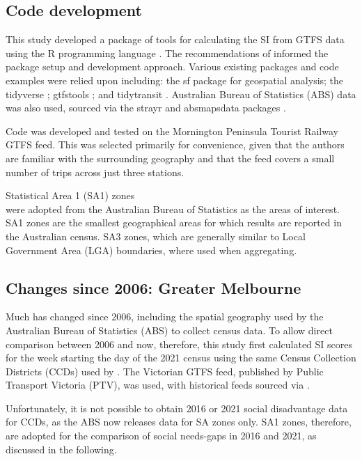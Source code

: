 \documentclass[preprint, 3p,
authoryear]{elsarticle} %
\begin{document}
\subsection{Code development}\label{code-development}

This study developed a package of tools for calculating the SI from GTFS
data using the R programming language \citep{R-base}. The
recommendations of \citet{wickham2023r} informed the package setup and
development approach. Various existing packages and code examples were
relied upon including: the sf package \citep{R-sf} for geospatial
analysis; the tidyverse \citep{tidyverse2019}; gtfstools
\citep{R-gtfstools}; and tidytransit \citep{R-tidytransit}. Australian
Bureau of Statistics (ABS) data was also used, sourced via the strayr
and absmapsdata packages \citep{r-strayr}.

Code was developed and tested on the Mornington Peninsula Tourist
Railway GTFS feed. This was selected primarily for convenience, given
that the authors are familiar with the surrounding geography and that
the feed covers a small number of trips across just three stations.

Statistical Area 1 (SA1) zones\\
were adopted from the Australian Bureau of Statistics \citep{ABSmaps} as
the areas of interest. SA1 zones are the smallest geographical areas for
which results are reported in the Australian census. SA3 zones, which
are generally similar to Local Government Area (LGA) boundaries, where
used when aggregating.

\subsection{Changes since 2006: Greater
Melbourne}\label{changes-since-2006-greater-melbourne}

Much has changed since 2006, including the spatial geography used by the
Australian Bureau of Statistics (ABS) to collect census data. To allow
direct comparison between 2006 and now, therefore, this study first
calculated SI scores for the week starting the day of the 2021 census
using the same Census Collection Districts (CCDs) used by
\citet{currie2010identifying}. The Victorian GTFS feed, published by
Public Transport Victoria (PTV), was used, with historical feeds sourced
via \citet{transitfeeds_victoria:2023aa}.

Unfortunately, it is not possible to obtain 2016 or 2021 social
disadvantage data for CCDs, as the ABS now releases data for SA zones
only. SA1 zones, therefore, are adopted for the comparison of social
needs-gaps in 2016 and 2021, as discussed in the following.
\end{document}
